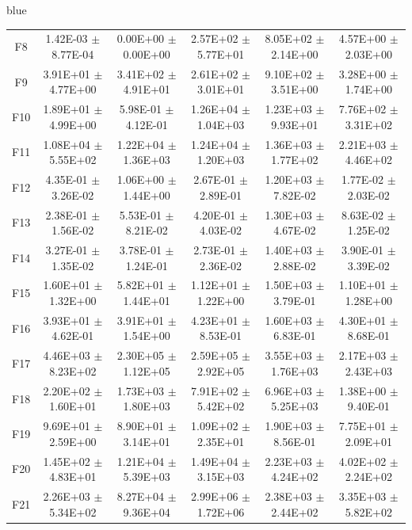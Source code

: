 \documentclass[journal, onecolumn]{IEEEtran}
\begin{document}
\begin{color}{blue}
\begin{table}[htbp!]
\begin{tabular}{c|ccccc}
			F8	 &	1.42E-03	$\pm$	8.77E-04		 &	0.00E+00	$\pm$	0.00E+00		 &	2.57E+02	$\pm$	5.77E+01		 &	8.05E+02	$\pm$	2.14E+00		 &	4.57E+00	$\pm$	2.03E+00	\\	
			F9	 &	3.91E+01	$\pm$	4.77E+00		 &	3.41E+02	$\pm$	4.91E+01		 &	2.61E+02	$\pm$	3.01E+01		 &	9.10E+02	$\pm$	3.51E+00		 &	3.28E+00	$\pm$	1.74E+00	\\	
			F10	 &	1.89E+01	$\pm$	4.99E+00		 &	5.98E-01	$\pm$	4.12E-01		 &	1.26E+04	$\pm$	1.04E+03		 &	1.23E+03	$\pm$	9.93E+01		 &	7.76E+02	$\pm$	3.31E+02	\\	
			F11	 &	1.08E+04	$\pm$	5.55E+02		 &	1.22E+04	$\pm$	1.36E+03		 &	1.24E+04	$\pm$	1.20E+03		 &	1.36E+03	$\pm$	1.77E+02		 &	2.21E+03	$\pm$	4.46E+02	\\	
			F12	 &	4.35E-01	$\pm$	3.26E-02		 &	1.06E+00	$\pm$	1.44E+00		 &	2.67E-01	$\pm$	2.89E-01		 &	1.20E+03	$\pm$	7.82E-02		 &	1.77E-02	$\pm$	2.03E-02	\\	
			F13	 &	2.38E-01	$\pm$	1.56E-02		 &	5.53E-01	$\pm$	8.21E-02		 &	4.20E-01	$\pm$	4.03E-02		 &	1.30E+03	$\pm$	4.67E-02		 &	8.63E-02	$\pm$	1.25E-02	\\	
			F14	 &	3.27E-01	$\pm$	1.35E-02		 &	3.78E-01	$\pm$	1.24E-01		 &	2.73E-01	$\pm$	2.36E-02		 &	1.40E+03	$\pm$	2.88E-02		 &	3.90E-01	$\pm$	3.39E-02	\\	
			F15	 &	1.60E+01	$\pm$	1.32E+00		 &	5.82E+01	$\pm$	1.44E+01		 &	1.12E+01	$\pm$	1.22E+00		 &	1.50E+03	$\pm$	3.79E-01		 &	1.10E+01	$\pm$	1.28E+00	\\	
			F16	 &	3.93E+01	$\pm$	4.62E-01		 &	3.91E+01	$\pm$	1.54E+00		 &	4.23E+01	$\pm$	8.53E-01		 &	1.60E+03	$\pm$	6.83E-01		 &	4.30E+01	$\pm$	8.68E-01	\\	
			F17	 &	4.46E+03	$\pm$	8.23E+02		 &	2.30E+05	$\pm$	1.12E+05		 &	2.59E+05	$\pm$	2.92E+05		 &	3.55E+03	$\pm$	1.76E+03		 &	2.17E+03	$\pm$	2.43E+03	\\	
			F18	 &	2.20E+02	$\pm$	1.60E+01		 &	1.73E+03	$\pm$	1.80E+03		 &	7.91E+02	$\pm$	5.42E+02		 &	6.96E+03	$\pm$	5.25E+03		 &	1.38E+00	$\pm$	9.40E-01	\\	
			F19	 &	9.69E+01	$\pm$	2.59E+00		 &	8.90E+01	$\pm$	3.14E+01		 &	1.09E+02	$\pm$	2.35E+01		 &	1.90E+03	$\pm$	8.56E-01		 &	7.75E+01	$\pm$	2.09E+01	\\	
			F20	 &	1.45E+02	$\pm$	4.83E+01		 &	1.21E+04	$\pm$	5.39E+03		 &	1.49E+04	$\pm$	3.15E+03		 &	2.23E+03	$\pm$	4.24E+02		 &	4.02E+02	$\pm$	2.24E+02	\\	
			F21	 &	2.26E+03	$\pm$	5.34E+02		 &	8.27E+04	$\pm$	9.36E+04		 &	2.99E+06	$\pm$	1.72E+06		 &	2.38E+03	$\pm$	2.44E+02		 &	3.35E+03	$\pm$	5.82E+02	\\	

\end{tabular}
\end{table}
\end{color}
\end{document}
